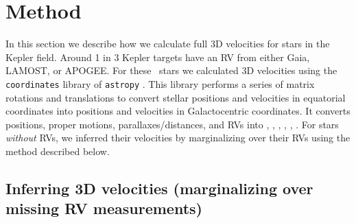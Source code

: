 \section{Method}
\label{sec:method}

In this section we describe how we calculate full 3D velocities for stars in
the Kepler field.
Around 1 in 3 Kepler targets have an RV from either Gaia, LAMOST, or APOGEE.
For these \nrv\ stars we calculated 3D velocities using the {\tt coordinates}
library of {\tt astropy} \citep{astropy2013, astropy2018}.
This library performs a series of matrix rotations and translations to convert
stellar positions and velocities in equatorial
coordinates into positions and velocities in Galactocentric coordinates.
It converts positions, proper motions, parallaxes/distances, and RVs into \x,
\y, \z, \vx, \vy, \vz.
For stars {\it without} RVs, we inferred their velocities by marginalizing
over their RVs using the method described below.


\subsection{Inferring 3D velocities (marginalizing over missing RV
measurements)}
\label{sec:inference}

